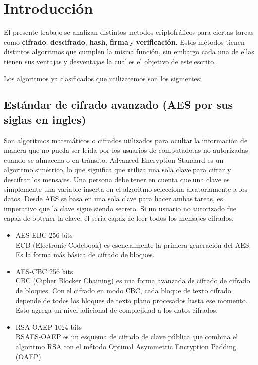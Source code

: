 \documentclass[../main.tex]{subfiles}
\begin{document}
\section{Introducción}\label{sec:introduccion}

El presente trabajo se analizan distintos metodos criptofráficos
para ciertas tareas como \textbf{cifrado}, \textbf{descifrado},
\textbf{hash}, \textbf{firma} y \textbf{verificación}. Estos
métodos tienen distintos algoritmos que cumplen la misma función,
sin embargo cada una de ellas tienen sus ventajas y desventajas la
cual es el objetivo de este escrito.

Los algoritmos ya clasificados que utilizaremos son los siguientes:

\subsection{Estándar de cifrado avanzado (AES por sus siglas en ingles)}\label{sec:estandar-de-cifrado-1}
Son algoritmos matemáticos o cifrados utilizados para ocultar
la información de manera que no pueda ser leída por los usuarios de
computadoras no autorizadas cuando se almacena o en tránsito.
Advanced Encryption Standard es un algoritmo simétrico, lo que significa
que utiliza una sola clave para cifrar y descifrar los mensajes. Una
persona debe tener en cuenta que una clave es simplemente una variable
inserta en el algoritmo selecciona aleatoriamente a los datos. Desde
AES se basa en una sola clave para hacer ambas tareas, es imperativo
que la clave sigue siendo secreto. Si un usuario no autorizado fue
capaz de obtener la clave, él sería capaz de leer todos los mensajes cifrados.
\begin{itemize}
  \item AES-EBC 256 bits\\
        ECB (Electronic Codebook) es esencialmente la primera generación del AES.\@
        Es la forma más básica de cifrado de bloques.
  \item AES-CBC 256 bits\\
        CBC (Cipher Blocker Chaining) es una forma avanzada de cifrado de cifrado de bloques.
        Con el cifrado en modo CBC, cada bloque de texto cifrado depende de todos los bloques
        de texto plano procesados hasta ese momento. Esto agrega un nivel adicional de
        complejidad a los datos cifrados.

  \item RSA-OAEP 1024 bits\\
        RSAES-OAEP es un esquema de cifrado de clave pública que combina el algoritmo RSA
        con el método Optimal Asymmetric Encryption Padding (OAEP)
\end{itemize}
\end{document}

